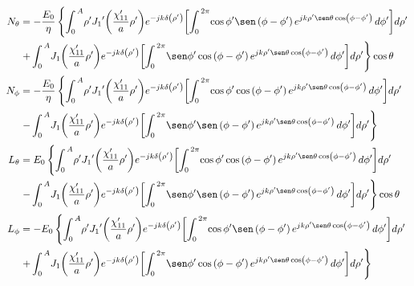 \begin{subequations}
\label{grup_ec_apC:26}
\begin{flalign}
N_{\theta} &= - \dfrac{E_0}{\eta}\left\{\int_{0}^{\,A}\!\rho '{J_1}'\!\left(\frac{\chi '_{11}}{a}\rho '\right)\!e^{-jk\delta\left(\rho '\right)}\!\left[\int_{0}^{\,2\pi}\!\cos\phi '\sen\left(\phi - \phi '\right)e^{jk\rho '\sen\theta\cos\left(\phi - \phi '\right)}\,d\phi '\right]\!d\rho '\right.\notag\\
&\left.+\int_{0}^{\,A}\!J_1\!\left(\frac{\chi '_{11}}{a}\rho '\right)\!e^{-jk\delta\left(\rho '\right)}\!\left[\int_{0}^{\,2\pi}\!\sen\phi '\cos\left(\phi - \phi '\right)e^{jk\rho '\sen\theta\cos\left(\phi - \phi '\right)}\,d\phi '\right]\!d\rho '\right\}\cos\theta
\label{ec_apC:117}\\
N_{\phi} &= - \dfrac{E_0}{\eta}\left\{\int_{0}^{\,A}\!\rho '{J_1}'\!\left(\frac{\chi '_{11}}{a}\rho '\right)\!e^{-jk\delta\left(\rho '\right)}\!\left[\int_{0}^{\,2\pi}\!\cos\phi '\cos\left(\phi - \phi '\right)e^{jk\rho '\sen\theta\cos\left(\phi - \phi '\right)}\,d\phi '\right]\!d\rho '\right.\notag\\
&\left.-\int_{0}^{\,A}\!J_1\!\left(\frac{\chi '_{11}}{a}\rho '\right)\!e^{-jk\delta\left(\rho '\right)}\!\left[\int_{0}^{\,2\pi}\!\sen\phi '\sen\left(\phi - \phi '\right)e^{jk\rho '\sen\theta\cos\left(\phi - \phi '\right)}\,d\phi '\right]\!d\rho '\right\}
\label{ec_apC:118}\\
L_{\theta} &= E_0\left\{\int_{0}^{\,A}\!\rho '{J_1}'\!\left(\frac{\chi '_{11}}{a}\rho '\right)\!e^{-jk\delta\left(\rho '\right)}\!\left[\int_{0}^{\,2\pi}\!\cos\phi '\cos\left(\phi - \phi '\right)e^{jk\rho '\sen\theta\cos\left(\phi - \phi '\right)}\,d\phi '\right]\!d\rho '\right.\notag\\
&\left.-\int_{0}^{\,A}\!J_1\!\left(\frac{\chi '_{11}}{a}\rho '\right)\!e^{-jk\delta\left(\rho '\right)}\!\left[\int_{0}^{\,2\pi}\!\sen\phi '\sen\left(\phi - \phi '\right)e^{jk\rho '\sen\theta\cos\left(\phi - \phi '\right)}\,d\phi '\right]\!d\rho '\right\}\cos\theta
\label{ec_apC:119}\\
L_{\phi} &= - E_0\left\{\int_{0}^{\,A}\!\rho '{J_1}'\!\left(\frac{\chi '_{11}}{a}\rho '\right)\!e^{-jk\delta\left(\rho '\right)}\!\left[\int_{0}^{\,2\pi}\!\cos\phi '\sen\left(\phi - \phi '\right)e^{jk\rho '\sen\theta\cos\left(\phi - \phi '\right)}\,d\phi '\right]\!d\rho '\right.\notag\\
&\left.+\int_{0}^{\,A}\!J_1\!\left(\frac{\chi '_{11}}{a}\rho '\right)\!e^{-jk\delta\left(\rho '\right)}\!\left[\int_{0}^{\,2\pi}\!\sen\phi '\cos\left(\phi - \phi '\right)e^{jk\rho '\sen\theta\cos\left(\phi - \phi '\right)}\,d\phi '\right]\!d\rho '\right\}
\label{ec_apC:120}
\end{flalign}
\end{subequations}
